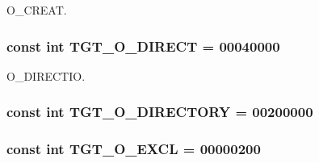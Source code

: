 O\_\-CREAT. \hypertarget{classX86Linux64_ae5d685a6a2ee8c6fe0ede370f0bec588}{
\subsubsection[{TGT\_\-O\_\-DIRECT}]{\setlength{\rightskip}{0pt plus 5cm}const int {\bf TGT\_\-O\_\-DIRECT} = 00040000}}
\label{classX86Linux64_ae5d685a6a2ee8c6fe0ede370f0bec588}


O\_\-DIRECTIO. \hypertarget{classX86Linux64_a1f10d158ad65ad6389078ba44629788a}{
\subsubsection[{TGT\_\-O\_\-DIRECTORY}]{\setlength{\rightskip}{0pt plus 5cm}const int {\bf TGT\_\-O\_\-DIRECTORY} = 00200000}}
\label{classX86Linux64_a1f10d158ad65ad6389078ba44629788a}
\hypertarget{classX86Linux64_a10d5d118d15b51ebdd4b16dc78342d1d}{
\subsubsection[{TGT\_\-O\_\-EXCL}]{\setlength{\rightskip}{0pt plus 5cm}const int {\bf TGT\_\-O\_\-EXCL} = 00000200}}
\label{classX86Linux64_a10d5d118d15b51ebdd4b16dc78342d1d}


